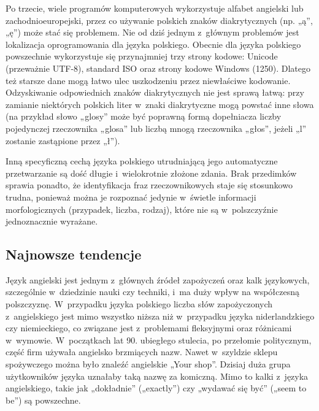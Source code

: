 \begin{multicols}{2}

Po trzecie, wiele programów komputerowych wykorzystuje alfabet
angielski lub zachodnioeuropejski, przez co używanie polskich znaków
diakrytycznych (np. „ą”, „ę”) może stać się problemem.
Nie od dziś jednym z~głównym problemów jest lokalizacja
oprogramowania dla języka polskiego. Obecnie dla języka polskiego
powszechnie wykorzystuje się przynajmniej trzy strony kodowe: Unicode
(przeważnie UTF-8), standard ISO oraz strony kodowe Windows (1250).
Dlatego też starsze dane mogą łatwo ulec uszkodzeniu przez
niewłaściwe kodowanie. Odzyskiwanie odpowiednich znaków
diakrytycznych nie jest sprawą łatwą: przy zamianie niektórych
polskich liter w~znaki diakrytyczne mogą powstać inne słowa (na
przykład słowo „glosy” może być poprawną formą dopełniacza
liczby pojedynczej rzeczownika „glosa” lub liczbą mnogą
rzeczownika „głos”, jeżeli „l” zostanie zastąpione przez
„ł”). 

Inną specyficzną cechą języka polskiego utrudniającą jego
automatyczne przetwarzanie są dość długie i~wielokrotnie złożone
zdania. Brak przedimków sprawia ponadto, że identyfikacja fraz
rzeczownikowych staje się stosunkowo trudna, ponieważ można je
rozpoznać jedynie w~świetle informacji morfologicznych (przypadek,
liczba, rodzaj), które nie są w~polszczyźnie jednoznacznie
wyrażane. 

\subsection[Najnowsze tendencje]{Najnowsze tendencje} Język angielski
jest jednym z~głównych źródeł zapożyczeń oraz kalk
językowych, szczególnie w~dziedzinie nauki czy techniki, i~ma duży
wpływ na współczesną polszczyznę. W~przypadku języka polskiego
liczba słów zapożyczonych z~angielskiego jest mimo wszystko niższa
niż w~przypadku języka niderlandzkiego czy niemieckiego, co
związane jest z~problemami fleksyjnymi oraz różnicami w~wymowie.
W~początkach lat 90. ubiegłego stulecia, po przełomie politycznym,
część firm używała angielsko brzmiących nazw. Nawet w~szyldzie
sklepu spożywczego można było znaleźć angielskie „Your shop”.
Dzisiaj duża grupa użytkowników języka uznałaby taką nazwę za
komiczną. Mimo to kalki z~języka angielskiego, takie jak
„dokładnie” („exactly”) czy „wydawać się być” („seem
to be”) są powszechne. 



\end{multicols}
